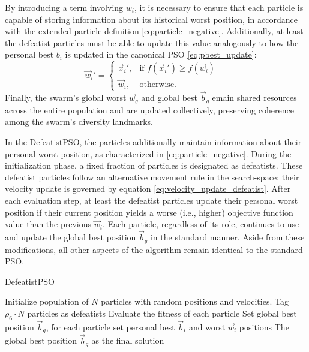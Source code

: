 {By introducing a term involving $w_i$, it is necessary to ensure that each particle is capable of storing information about its historical worst position, in accordance with the extended particle definition \eqref{eq:particle_negative}. Additionally, at least the defeatist particles must be able to update this value analogously to how the personal best  $b_i$ is updated in the canonical PSO \eqref{eq:pbest_update}:
\begin{equation}
\vec{w}_i' = 
    \begin{cases}
    \vec{x}_i', & \text{if } f(\vec{x}_i') \geq f(\vec{w}_i) \\ %
    \vec{w}_i, & \text{otherwise.}
    \end{cases}
\quad \label{eq:pworst_update_defeatist}
\end{equation}
Finally, the swarm's global worst $\vec{w}_g$ and global best $\vec{b}_g$ emain shared resources across the entire population and are updated collectively, preserving coherence among the swarm’s diversity landmarks.


In the DefeatistPSO, the particles additionally maintain information about their personal worst position, as characterized in \eqref{eq:particle_negative}. During the initialization phase, a fixed fraction of particles is designated as defeatists. These defeatist particles follow an alternative movement rule in the \gls{search-space}: their velocity update is governed by equation \eqref{eq:velocity_update_defeatist}. After each evaluation step, at least the defeatist particles update their personal worst position if their current position yields a worse (i.e., higher) objective function value than the previous $\vec{w}_i$. Each particle, regardless of its role, continues to use and update the global best position $\vec{b}_g$ in the standard manner. Aside from these modifications, all other aspects of the algorithm remain identical to the standard PSO.

\vspace{.935em}
\begin{algorithm}[H]
\caption{DefeatistPSO}\label{alg:defeatist}
Initialize population of \(N\) particles with random positions and velocities. Tag \(\rho_6 \cdot N\) particles as defeatists\;
Evaluate the fitness of each particle\;
Set global best position \(\vec{b}_g\), for each particle set personal best \(\vec{b}_i\) and worst \(\vec{w}_i\) positions\;
\Return The global best position \(\vec{b}_g\) as the final solution\;
\end{algorithm}
\vspace{.535em}


}
